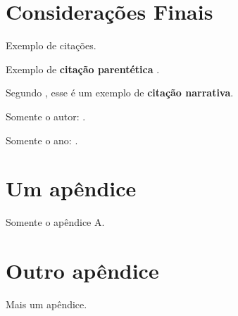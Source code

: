 \documentclass[12pt]{article}
\begin{document}
\section{Considerações Finais}\label{sec:finais}

Exemplo de citações.

Exemplo de \textbf{citação parentética} \cite{Teste2025}.

Segundo , esse é um exemplo de \textbf{citação narrativa}.


Somente o autor: \citeauthor{Teste2025}.

Somente o ano: \citeyear{Teste2025}.


% 



% 

\appendix
\renewcommand{\thesection}{Apêndice \Alph{section}}
\section{Um apêndice}\label{sec:apendA}

Somente o apêndice A.


\section{Outro apêndice}\label{sec:apendB}

Mais um apêndice.
\end{document}

